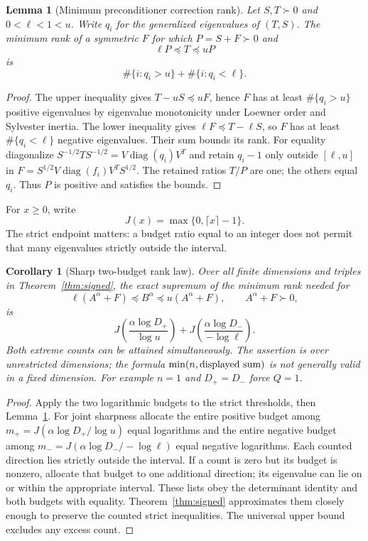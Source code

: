 \documentclass[11pt]{article}
\newtheorem{lemma}[theorem]{Lemma}
\newtheorem{corollary}[theorem]{Corollary}
\newcommand{\diag}{\operatorname{diag}}
\begin{document}
\begin{lemma}[Minimum preconditioner correction rank]\label{lem:rank}
Let $S,T\succ0$ and $0<\ell<1<u$. Write $q_i$ for the generalized
eigenvalues of $(T,S)$. The minimum rank of a symmetric $F$ for which
$P=S+F\succ0$ and
\[
                  \ell P\preceq T\preceq uP
\]
is
\[
       \#\{i:q_i>u\}+\#\{i:q_i<\ell\}.
\]
\end{lemma}
\begin{proof}
The upper inequality gives $T-uS\preceq uF$, hence $F$ has at least
$\#\{q_i>u\}$ positive eigenvalues by eigenvalue monotonicity under
Loewner order and Sylvester inertia. The lower inequality gives
$\ell F\preceq T-\ell S$, so $F$ has at least
$\#\{q_i<\ell\}$ negative eigenvalues. Their sum bounds its rank.
For equality diagonalize $S^{-1/2}TS^{-1/2}=V\diag(q_i)V^T$ and retain
$q_i-1$ only outside $[\ell,u]$ in
$F=S^{1/2}V\diag(f_i)V^TS^{1/2}$. The retained ratios $T/P$ are one;
the others equal $q_i$. Thus $P$ is positive and satisfies the bounds.
\end{proof}

For $x\ge0$, write
\[
       J(x)=\max\{0,\lceil x\rceil-1\}.
\]
The strict endpoint matters: a budget ratio equal to an integer does not
permit that many eigenvalues strictly outside the interval.

\begin{corollary}[Sharp two-budget rank law]\label{cor:twobudget}
Over all finite dimensions and triples in Theorem~\ref{thm:signed}, the
exact supremum of the minimum rank needed for
\[
 \ell(A^\alpha+F)\preceq B^\alpha\preceq u(A^\alpha+F),
 \qquad A^\alpha+F\succ0,
\]
is
\[
 J\!\left(\frac{\alpha\log D_+}{\log u}\right)
 +J\!\left(\frac{\alpha\log D_-}{-\log\ell}\right).
\]
Both extreme counts can be attained simultaneously. The assertion is over
unrestricted dimensions; the formula $\min(n,\hbox{displayed sum})$ is
\emph{not} generally valid in a fixed dimension. For example $n=1$ and
$D_+=D_-$ force $Q=1$.
\end{corollary}
\begin{proof}
Apply the two logarithmic budgets to the strict thresholds, then
Lemma~\ref{lem:rank}. For joint sharpness allocate the entire positive
budget among $m_+=J(\alpha\log D_+/\log u)$ equal logarithms and the
entire negative budget among $m_-=J(\alpha\log D_-/-\log\ell)$ equal
negative logarithms. Each counted direction lies strictly outside the
interval. If a count is zero but its budget is nonzero, allocate that
budget to one additional direction; its eigenvalue can lie on or within
the appropriate interval. These lists obey the determinant identity and
both budgets with equality. Theorem~\ref{thm:signed} approximates them
closely enough to preserve the counted strict inequalities. The universal
upper bound excludes any excess count.
\end{proof}
\end{document}
